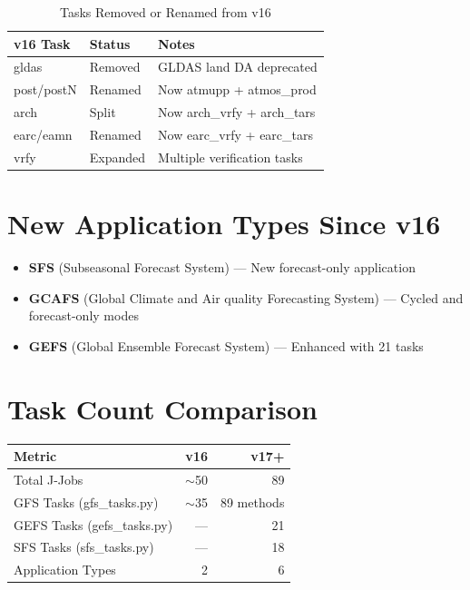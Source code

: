 \documentclass[11pt,letterpaper]{article}
\begin{document}
\begin{table}[H]
\centering
\caption{Tasks Removed or Renamed from v16}
\small
\begin{tabular}{@{}lll@{}}
\toprule
\textbf{v16 Task} & \textbf{Status} & \textbf{Notes} \\
\midrule
gldas & Removed & GLDAS land DA deprecated \\
post/postN & Renamed & Now atmupp + atmos\_prod \\
arch & Split & Now arch\_vrfy + arch\_tars \\
earc/eamn & Renamed & Now earc\_vrfy + earc\_tars \\
vrfy & Expanded & Multiple verification tasks \\
\bottomrule
\end{tabular}
\end{table}

\section*{New Application Types Since v16}

\begin{itemize}
    \item \textbf{SFS} (Subseasonal Forecast System) --- New forecast-only application
    \item \textbf{GCAFS} (Global Climate and Air quality Forecasting System) --- Cycled and forecast-only modes
    \item \textbf{GEFS} (Global Ensemble Forecast System) --- Enhanced with 21 tasks
\end{itemize}

\section*{Task Count Comparison}

\begin{table}[H]
\centering
\begin{tabular}{@{}lrr@{}}
\toprule
\textbf{Metric} & \textbf{v16} & \textbf{v17+} \\
\midrule
Total J-Jobs & $\sim$50 & 89 \\
GFS Tasks (gfs\_tasks.py) & $\sim$35 & 89 methods \\
GEFS Tasks (gefs\_tasks.py) & --- & 21 \\
SFS Tasks (sfs\_tasks.py) & --- & 18 \\
Application Types & 2 & 6 \\
\bottomrule
\end{tabular}
\end{table}
\end{document}
